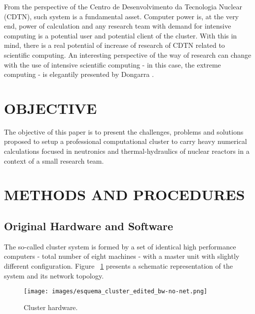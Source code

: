 \documentclass[twoside,a4paper,12pt,english,draft]{inac17}
\begin{document}
From the perspective of the Centro de Desenvolvimento da Tecnologia Nuclear (CDTN), such system
is a fundamental asset. Computer power is, at the very end, power of calculation and any research
team with demand for intensive computing is a potential user and potential client of the cluster.
With this in mind, there is a real potential of increase of research of CDTN related to
scientific computing. An interesting perspective of the way of research can change with the
use of intensive scientific computing - in this case, the extreme computing - is elegantily
presented by Dongarra \cite{Dongarra2017}.



\section{OBJECTIVE}

The objective of this paper is to present the challenges, problems and solutions proposed
to setup a professional computational cluster to carry heavy numerical calculations focused in
neutronics and thermal-hydraulics of nuclear reactors in a
context of a small research team.



\section{METHODS AND PROCEDURES}

\subsection{Original Hardware and Software}

The so-called cluster system is formed by a set of identical high performance computers -
total number of eight machines - with a master unit with slightly different configuration.
Figure ~\ref{fig:cluster} presents a schematic representation of the system and
its network topology.

\begin{figure}[h] %
  \centering\texttt{[image: images/esquema\_cluster\_edited\_bw-no-net.png]}
  \caption{Cluster hardware.}
  \label{fig:cluster}
\end{figure}
\end{document}
